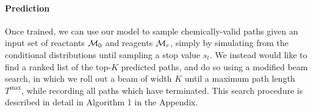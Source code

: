 \paragraph{Prediction}
Once trained, we can use our model to sample chemically-valid paths given an input set of reactants ${\mathcal{M}}_0$ and reagents ${\mathcal{M}}_r$, 
simply by simulating from the conditional distributions until sampling a stop value $s_t$.
We instead would like to find a ranked list of the top-$K$ predicted paths, and do so using a modified beam search,
in which we roll out a beam of width $K$ until a maximum path length $T^\mathrm{max}$,
while recording all paths which have terminated.
This search procedure is described in detail in Algorithm 1 in the Appendix.



